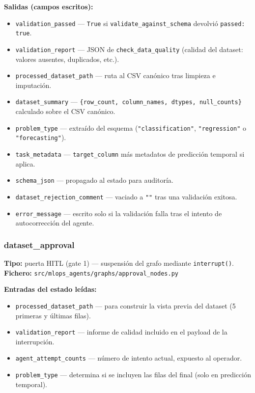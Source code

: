 \textbf{Salidas (campos escritos):}
\begin{itemize}
  \item \texttt{validation\_passed} — \texttt{True} si \texttt{validate\_against\_schema} devolvió \texttt{passed: true}.
  \item \texttt{validation\_report} — JSON de \texttt{check\_data\_quality} (calidad del dataset: valores ausentes, duplicados, etc.).
  \item \texttt{processed\_dataset\_path} — ruta al CSV canónico tras limpieza e imputación.
  \item \texttt{dataset\_summary} — \texttt{\{row\_count, column\_names, dtypes, null\_counts\}} calculado sobre el CSV canónico.
  \item \texttt{problem\_type} — extraído del esquema (\texttt{"classification"}, \texttt{"regression"} o \texttt{"forecasting"}).
  \item \texttt{task\_metadata} — \texttt{target\_column} más metadatos de predicción temporal si aplica.
  \item \texttt{schema\_json} — propagado al estado para auditoría.
  \item \texttt{dataset\_rejection\_comment} — vaciado a \texttt{""} tras una validación exitosa.
  \item \texttt{error\_message} — escrito solo si la validación falla tras el intento de autocorrección del agente.
\end{itemize}

\subsubsection*{dataset\_approval}
\label{sec:nodo-gate1}

\textbf{Tipo:} puerta HITL (gate 1) --- suspensión del grafo mediante \texttt{interrupt()}.\\
\textbf{Fichero:} \texttt{src/mlops\_agents/graphs/approval\_nodes.py}

\textbf{Entradas del estado leídas:}
\begin{itemize}
  \item \texttt{processed\_dataset\_path} — para construir la vista previa del dataset (5 primeras y últimas filas).
  \item \texttt{validation\_report} — informe de calidad incluido en el payload de la interrupción.
  \item \texttt{agent\_attempt\_counts} — número de intento actual, expuesto al operador.
  \item \texttt{problem\_type} — determina si se incluyen las filas del final (solo en predicción temporal).
\end{itemize}

